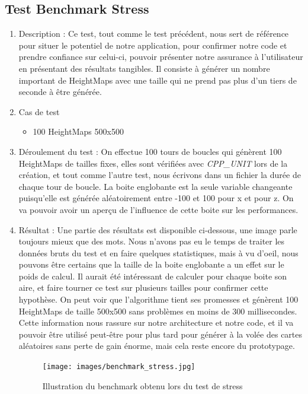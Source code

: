 \documentclass[12pt]{report}
\begin{document}
\subsection{Test Benchmark Stress}
\begin{enumerate}
    \item Description : Ce test, tout comme le test précédent, nous sert de référence pour situer le potentiel de notre application, pour confirmer notre code et prendre confiance sur celui-ci, pouvoir présenter notre assurance à l'utilisateur en présentant des résultats tangibles. Il consiste à générer un nombre important de HeightMaps avec une taille qui ne prend pas plus d'un tiers de seconde à être générée.
    \item Cas de test
    \begin{itemize}
        \item 100 HeightMaps 500x500
    \end{itemize}
    \item Déroulement du test : On effectue 100 tours de boucles qui génèrent 100 HeightMaps de tailles fixes, elles sont vérifiées avec \emph{CPP\_UNIT} lors de la création, et tout comme l'autre test, nous écrivons dans un fichier la durée de chaque tour de boucle. La boite englobante est la seule variable changeante puisqu'elle est générée aléatoirement entre -100 et 100 pour x et pour z. On va pouvoir avoir un aperçu de l'influence de cette boite sur les performances.
    \item Résultat : Une partie des résultats est disponible ci-dessous, une image parle toujours mieux que des mots. Nous n'avons pas eu le temps de traiter les données bruts du test et en faire quelques statistiques, mais à vu d'oeil, nous pouvons être certains que la taille de la boite englobante a un effet sur le poids de calcul. Il aurait été intéressant de calculer pour chaque boite son aire, et faire tourner ce test sur plusieurs tailles pour confirmer cette hypothèse. On peut voir que l'algorithme tient ses promesses et génèrent 100 HeightMaps de taille 500x500 sans problèmes en moins de 300 millisecondes. Cette information nous rassure sur notre architecture et notre code, et il va pouvoir être utilisé peut-être pour plus tard pour générer à la volée des cartes aléatoires sans perte de gain énorme, mais cela reste encore du prototypage.
    
    \begin{figure}[h]
    \begin{center}
    \texttt{[image: images/benchmark\_stress.jpg]}
    \caption{Illustration du benchmark obtenu lors du test de stress}
    \end{center}
\end{figure}
    
\end{enumerate}
\end{document}
